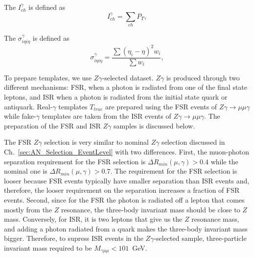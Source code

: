 The $I_{ch}^{\gamma}$ is defined as
\begin{equation}
  I_{ch}^{\gamma} = \sum_{ch} P_T,
\end{equation} 

The $\sigma_{i\eta i\eta}^{\gamma}$ is defined as
\begin{equation}
  \sigma_{i\eta i\eta}^{\gamma} = \frac{\sum{(\eta_i-\eta)^2 w_i}}{\sum{w_i}},
\end{equation}

To prepare templates, we use $Z\gamma$-selected dataset. $Z\gamma$ is produced through two different mechanisms: FSR, when a photon is radiated from one of the final state leptons, and ISR when a photon is radiated from the initial state quark or antiquark. Real-$\gamma$ templates $T_{true}$ are prepared using the FSR events of $Z\gamma\rightarrow\mu\mu\gamma$ while fake-$\gamma$ templates are taken from the ISR events of $Z\gamma\rightarrow\mu\mu\gamma$. The preparation of the FSR and ISR $Z\gamma$ samples is discussed below.

The FSR $Z\gamma$ selection is very similar to nominal $Z\gamma$ selection discussed in Ch.~\ref{sec:AN_Selection_EventLevel} with two differences. First, the muon-photon separation requirement for the FSR selection is $\Delta R_{min}(\mu,\gamma)>0.4$ while the nominal one is $\Delta R_{min}(\mu,\gamma)>0.7$. The requirement for the FSR selection is looser because FSR events typically have smaller separation than ISR events and, therefore, the looser requirement on the separation increases a fraction of FSR events. Second, since for the FSR the photon is radiated off a lepton that comes mostly from the $Z$ resonance, the three-body invariant mass should be close to $Z$ mass. Conversely, for ISR, it is two leptons that give us the $Z$ resonance mass, and adding a photon radiated from a quark makes the three-body invariant mass bigger. Therefore, to supress ISR events in the $Z\gamma$-selected sample, three-particle invariant mass required to be $M_{\gamma\mu\mu}<101$~GeV. 

